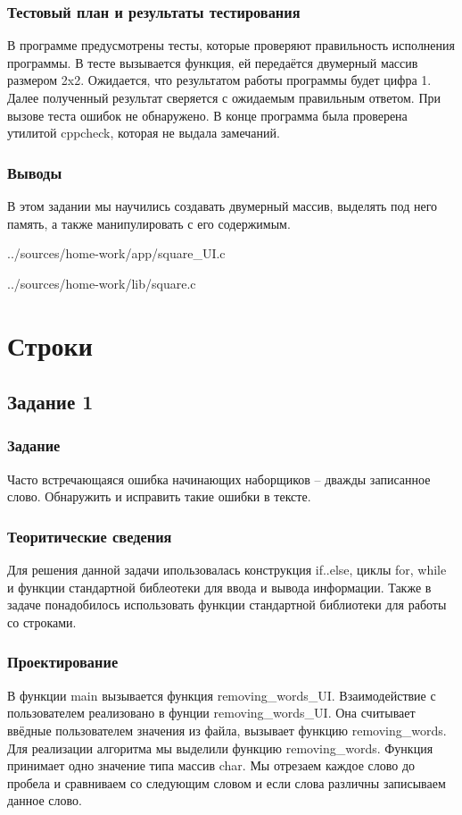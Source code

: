 \documentclass[12pt,a4paper]{report}
\begin{document}
\subsection{Тестовый план и результаты тестирования}
В программе предусмотрены тесты, которые проверяют правильность исполнения программы. В тесте вызывается функция, ей передаётся двумерный массив размером 2x2. Ожидается, что результатом работы программы будет цифра 1. Далее полученный результат сверяется с ожидаемым правильным ответом. При вызове теста ошибок не обнаружено. В конце программа была проверена утилитой cppcheck, которая не выдала замечаний.
\subsection{Выводы}
В этом задании мы научились создавать двумерный массив, выделять под него память, а также манипулировать с его содержимым.

{../sources/home-work/app/square_UI.c}


{../sources/home-work/lib/square.c}
\chapter{Строки}
\section{Задание 1}
\subsection{Задание}
Часто встречающаяся ошибка начинающих наборщиков – дважды записанное слово. Обнаружить и исправить такие ошибки в тексте.
\subsection{Теоритические сведения}
Для решения данной задачи ипользовалась конструкция if..else, циклы for, while и функции стандартной библеотеки для ввода и вывода информации. Также в задаче понадобилось использовать функции стандартной библиотеки для работы со строками.
\subsection{Проектирование}
В функции main вызывается функция removing\_words\_UI. Взаимодействие с пользователем реализовано в фунции removing\_words\_UI. Она считывает ввёдные пользователем значения из файла, вызывает функцию removing\_words. Для реализации алгоритма мы выделили функцию removing\_words. Функция принимает одно значение типа массив char. Мы отрезаем каждое слово до пробела и сравниваем со следующим словом и если слова различны записываем данное слово.
\end{document}
